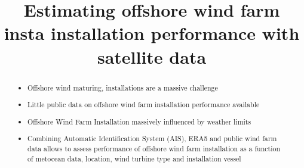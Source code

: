 \documentclass[wes, manuscript]{copernicus}
\begin{document}
\title{Estimating offshore wind farm insta installation performance with satellite data}











\received{}
\pubdiscuss{} %
\revised{}
\accepted{}
\published{}




\maketitle



\begin{abstract}

\begin{itemize}

    \item Offshore wind maturing, installations are a massive challenge
    \item Little public data on offshore wind farm installation performance available
    \item Offshore Wind Farm Installation massively influenced by weather limits
    \item Combining Automatic Identification System (AIS), ERA5 and public wind farm data allows to assess performance of
offshore wind farm installation as a function of metocean data, location, wind turbine type and installation vessel

\end{itemize}

\end{abstract}
\end{document}

